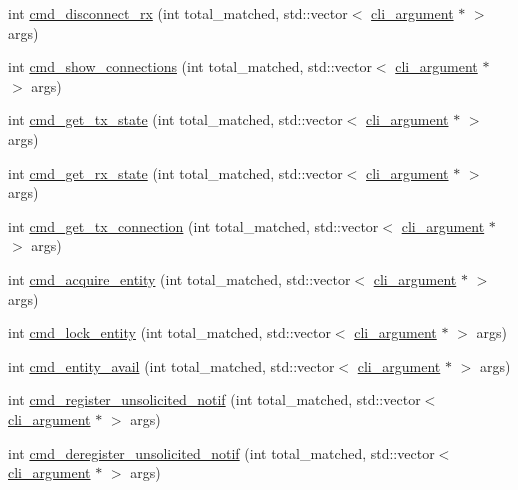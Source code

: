 \begin{DoxyCompactItemize}
\item 
int \hyperlink{classcmd__line_a5cdfb276705d76d2f6046c4e5cdf56f4}{cmd\+\_\+disconnect\+\_\+rx} (int total\+\_\+matched, std\+::vector$<$ \hyperlink{classcli__argument}{cli\+\_\+argument} $\ast$ $>$ args)
\item 
int \hyperlink{classcmd__line_a3154e7ccbcc97337b905604d2756f5d1}{cmd\+\_\+show\+\_\+connections} (int total\+\_\+matched, std\+::vector$<$ \hyperlink{classcli__argument}{cli\+\_\+argument} $\ast$ $>$ args)
\item 
int \hyperlink{classcmd__line_a9537b40689b6ca147bd4fb615cb3ee68}{cmd\+\_\+get\+\_\+tx\+\_\+state} (int total\+\_\+matched, std\+::vector$<$ \hyperlink{classcli__argument}{cli\+\_\+argument} $\ast$ $>$ args)
\item 
int \hyperlink{classcmd__line_a68e20645ab1852e7cf7898896e0359ad}{cmd\+\_\+get\+\_\+rx\+\_\+state} (int total\+\_\+matched, std\+::vector$<$ \hyperlink{classcli__argument}{cli\+\_\+argument} $\ast$ $>$ args)
\item 
int \hyperlink{classcmd__line_afbf6ddf3b87cb81058a69556fde9d9be}{cmd\+\_\+get\+\_\+tx\+\_\+connection} (int total\+\_\+matched, std\+::vector$<$ \hyperlink{classcli__argument}{cli\+\_\+argument} $\ast$ $>$ args)
\item 
int \hyperlink{classcmd__line_aab543450aab7d747196e9c57ae393081}{cmd\+\_\+acquire\+\_\+entity} (int total\+\_\+matched, std\+::vector$<$ \hyperlink{classcli__argument}{cli\+\_\+argument} $\ast$ $>$ args)
\item 
int \hyperlink{classcmd__line_a37344636c6334274b9dabb8f4a447ab0}{cmd\+\_\+lock\+\_\+entity} (int total\+\_\+matched, std\+::vector$<$ \hyperlink{classcli__argument}{cli\+\_\+argument} $\ast$ $>$ args)
\item 
int \hyperlink{classcmd__line_ac075cd96d2688c183de85fbe92a8e9d2}{cmd\+\_\+entity\+\_\+avail} (int total\+\_\+matched, std\+::vector$<$ \hyperlink{classcli__argument}{cli\+\_\+argument} $\ast$ $>$ args)
\item 
int \hyperlink{classcmd__line_a8e9f80a8fd0c927d8b6500d1d5b9f797}{cmd\+\_\+register\+\_\+unsolicited\+\_\+notif} (int total\+\_\+matched, std\+::vector$<$ \hyperlink{classcli__argument}{cli\+\_\+argument} $\ast$ $>$ args)
\item 
int \hyperlink{classcmd__line_a6abd51584255e825872e14094c48f9ef}{cmd\+\_\+deregister\+\_\+unsolicited\+\_\+notif} (int total\+\_\+matched, std\+::vector$<$ \hyperlink{classcli__argument}{cli\+\_\+argument} $\ast$ $>$ args)
\item 

\end{DoxyCompactItemize}
